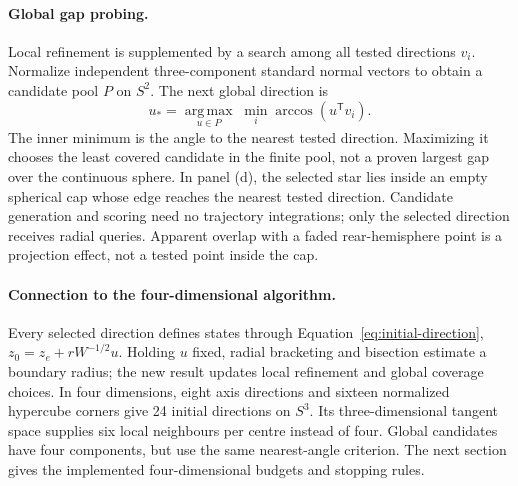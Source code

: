 \begin{bluerevision}
\paragraph{Global gap probing.}
Local refinement is supplemented by a search among all tested directions $v_i$. Normalize independent three-component standard normal vectors to obtain a candidate pool $P$ on $S^2$. The next global direction is
\[
 u_* = \underset{u\in P}{\operatorname{arg\,max}}\;
       \min_i\arccos(u^{\mathsf T}v_i).
\]
The inner minimum is the angle to the nearest tested direction. Maximizing it chooses the least covered candidate in the finite pool, not a proven largest gap over the continuous sphere. In panel (d), the selected star lies inside an empty spherical cap whose edge reaches the nearest tested direction. Candidate generation and scoring need no trajectory integrations; only the selected direction receives radial queries. Apparent overlap with a faded rear-hemisphere point is a projection effect, not a tested point inside the cap.

\paragraph{Connection to the four-dimensional algorithm.}
Every selected direction defines states through Equation~\eqref{eq:initial-direction}, $z_0=z_e+rW^{-1/2}u$. Holding $u$ fixed, radial bracketing and bisection estimate a boundary radius; the new result updates local refinement and global coverage choices. In four dimensions, eight axis directions and sixteen normalized hypercube corners give 24 initial directions on $S^3$. Its three-dimensional tangent space supplies six local neighbours per centre instead of four. Global candidates have four components, but use the same nearest-angle criterion. The next section gives the implemented four-dimensional budgets and stopping rules.
\end{bluerevision}
